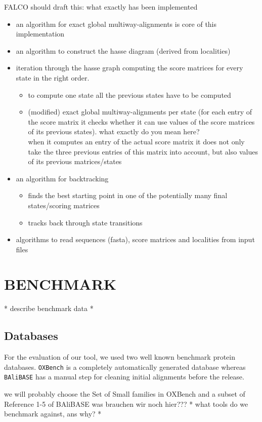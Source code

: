\documentclass[a4paper,10pt]{article}
\newcommand{\TODO}[1]{\begingroup\color{red}#1\endgroup}
\newcommand{\NR}[1]{\begingroup\color{orange}#1\endgroup}
\begin{document}
\TODO{FALCO should draft this: what exactly has been implemented} 
\begin{itemize}
    \item an algorithm for exact global multiway-alignments is core of this implementation
    \item an algorithm to construct the hasse diagram (derived from localities)
    \item iteration through the hasse graph computing the score matrices for every state in the right order. 
    \begin{itemize}
        \item to compute one state all the previous states have to be computed
        \item (modified) exact global multiway-alignments per state (for
          each entry of the score matrix it checks whether it can use
          values of the score matrices of its previous states).
          \TODO{what exactly do you mean here?} \\
          when it computes an entry of the actual score matrix it does not only take the three previous entries of this matrix into account, but also values of its previous matrices/states
    \end{itemize}
    \item an algorithm for backtracking
    \begin{itemize}
        \item finds the best starting point in one of the potentially many final states/scoring matrices
        \item tracks back through state transitions 
    \end{itemize}
    \item algorithms to read sequences (fasta), score matrices and localities from input files
\end{itemize}

\section{\uppercase{Benchmark}}

\TODO{* describe benchmark data *}
\NR{
\subsection{Databases}
For the evaluation of our tool, we used two well known benchmark protein databases. \texttt{OXBench}
\cite{oxbench} is a completely automatically generated database whereas \texttt{BAliBASE} 
\cite{balibase} has a manual step for cleaning initial alignments before the release.

\TODO{we will  probably choose the Set of Small families in OXBench and a subset of 
Reference 1-5 of BAliBASE}
}
\TODO{was brauchen wir noch hier???}
\TODO{* what tools do we benchmark against, ans why? *} 
\end{document}

